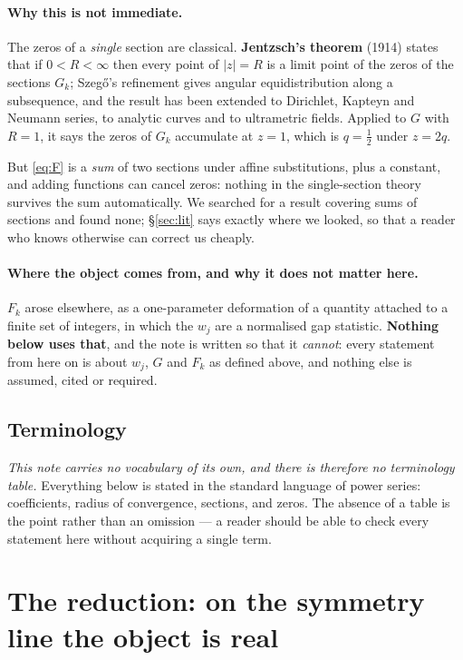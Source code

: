 \documentclass[11pt,a4paper]{article}
\theoremstyle{plain}
\theoremstyle{definition}
\theoremstyle{remark}
\begin{document}
\paragraph{Why this is not immediate.}
The zeros of a \emph{single} section are classical. \textbf{Jentzsch's theorem} (1914)
states that if $0<R<\infty$ then every point of $|z|=R$ is a limit point of the zeros of
the sections $G_k$; Szeg\H{o}'s refinement gives angular equidistribution along a
subsequence, and the result has been extended to Dirichlet, Kapteyn and Neumann series,
to analytic curves and to ultrametric fields. Applied to $G$ with $R=1$, it says the
zeros of $G_k$ accumulate at $z=1$, which is $q=\tfrac12$ under $z=2q$.

But \eqref{eq:F} is a \emph{sum} of two sections under affine substitutions, plus a
constant, and adding functions can cancel zeros: nothing in the single-section theory
survives the sum automatically. We searched for a result covering sums of sections and
found none; \S\ref{sec:lit} says exactly where we looked, so that a reader who knows
otherwise can correct us cheaply.

\paragraph{Where the object comes from, and why it does not matter here.}
$F_k$ arose elsewhere, as a one-parameter deformation of a quantity attached to a finite
set of integers, in which the $w_j$ are a normalised gap statistic. \textbf{Nothing below
uses that}, and the note is written so that it \emph{cannot}: every statement from here on
is about $w_j$, $G$ and $F_k$ as defined above, and nothing else is assumed, cited or
required.

\subsection{Terminology}\label{sec:terminology-note}

\emph{This note carries no vocabulary of its own, and there is therefore no terminology
table.} Everything below is stated in the standard language of power series: coefficients,
radius of convergence, sections, and zeros. The absence of a table is the point rather
than an omission --- a reader should be able to check every statement here without
acquiring a single term.


\section{The reduction: on the symmetry line the object is real}\label{sec:reduction}
\end{document}
